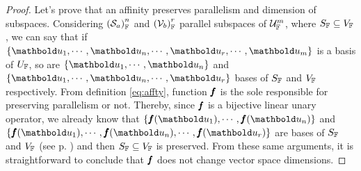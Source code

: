 {\footnotesize
\begin{proof}
Let's prove that an affinity preserves parallelism and dimension of subspaces. Considering $\eamsd{S}{F}{a}{n}$ and $\eamsd{V}{F}{b}{r}$ parallel subspaces of $\eamd{U}{F}{m}$, where $S_\cam{F}\subseteq V_\cam{F}$, we can say that if $\{\vto{u}_1,\cdots,\vto{u}_n,\cdots,\vto{u}_r,\cdots,\vto{u}_m\}$ is a basis of $U_\cam{F}$, so are $\{\vto{u}_1,\cdots,\vto{u}_n\}$ and $\{\vto{u}_1,\cdots,\vto{u}_n,\cdots,\vto{u}_r\}$ bases of $S_\cam{F}$ and $V_\cam{F}$ respectively. From definition \eqref{eq:affty}, function $\vtf{f}$ is the sole responsible for preserving parallelism or not. Thereby, since $\vtf{f}$ is a bijective linear unary operator, we already know that $\{\fua{\vtf{f}}{\vto{u}_1},\cdots,\fua{\vtf{f}}{\vto{u}_n}\}$ and $\{\fua{\vtf{f}}{\vto{u}_1},\cdots,\fua{\vtf{f}}{\vto{u}_n},\cdots,\fua{\vtf{f}}{\vto{u}_r}\}$ are bases of $S_\cam{F}$ and $V_\cam{F}$ (see p. \pageref{pg:bijecOpe}) and then $S_\cam{F}\subseteq V_\cam{F}$ is preserved. From these same arguments, it is straightforward to conclude that $\vtf{f}$ does not change vector space dimensions.
\end{proof}}


